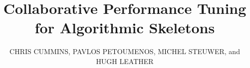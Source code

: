 %
%
%
%






\title{Collaborative Performance Tuning for Algorithmic Skeletons}

\author{CHRIS CUMMINS, PAVLOS PETOUMENOS, MICHEL STEUWER, and HUGH LEATHER
}

